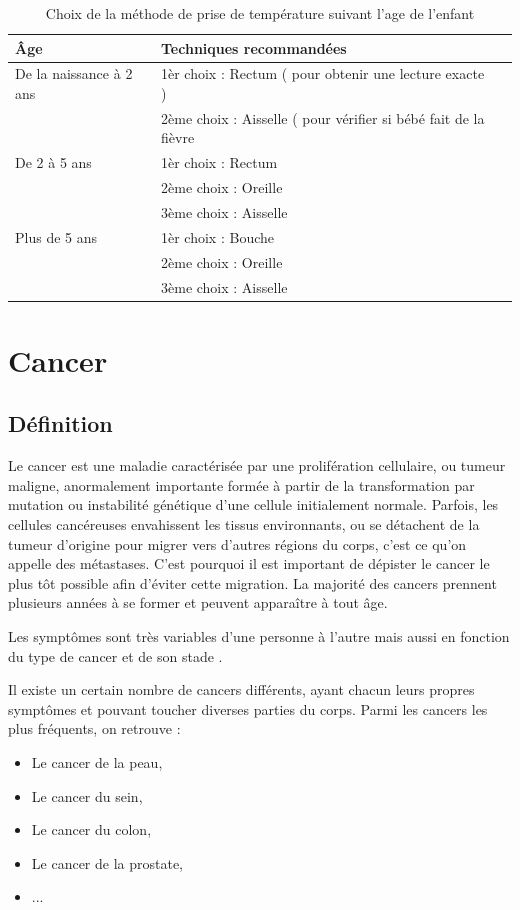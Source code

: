\documentclass[12pt]{article}
\begin{document}
\begin{table}[h]
	\centering
	\caption{Choix de la méthode de prise de température suivant l’age de l’enfant}
	\begin{tabular}{ | l | l | c }
		\hline
		\bfseries{Âge} & \bfseries{Techniques recommandées}\\ \hline
		De la naissance à 2 ans & 1èr choix : Rectum ( pour obtenir une lecture exacte )\\
		                                      &  2ème choix : Aisselle ( pour vérifier si bébé fait de la fièvre\\
\hline
		De 2 à 5 ans & 1èr choix : Rectum\\
							& 2ème choix : Oreille\\
							& 3ème choix : Aisselle\\ 
\hline
		Plus de 5 ans & 1èr choix : Bouche\\
							  & 2ème choix : Oreille\\
							  & 3ème choix : Aisselle\\ 
\hline 
	\end{tabular}
\end{table}




\section{Cancer}
\subsection{Définition}
Le cancer est une maladie caractérisée par une prolifération cellulaire, ou tumeur maligne, anormalement importante formée à partir de la transformation par mutation ou instabilité génétique d'une cellule initialement normale. Parfois, les cellules cancéreuses envahissent les tissus environnants, ou se détachent de la tumeur d'origine pour migrer vers d'autres régions du corps, c'est ce qu'on appelle des métastases. C'est pourquoi il est important de dépister le cancer le plus tôt possible afin d'éviter cette migration. La majorité des cancers prennent plusieurs années à se former et peuvent apparaître à tout âge. 

Les symptômes sont très variables d'une personne à l'autre mais aussi en fonction du type de cancer et de son stade \cite{31}.

Il existe un certain nombre de cancers différents, ayant chacun leurs propres symptômes et pouvant toucher diverses parties du corps. Parmi les cancers les plus fréquents, on retrouve :
\begin{itemize}
	\item  Le cancer de la peau,
	\item Le cancer du sein,
	\item Le cancer du colon,
	\item Le cancer de la prostate,
	\item ...
\end{itemize}
\end{document}
